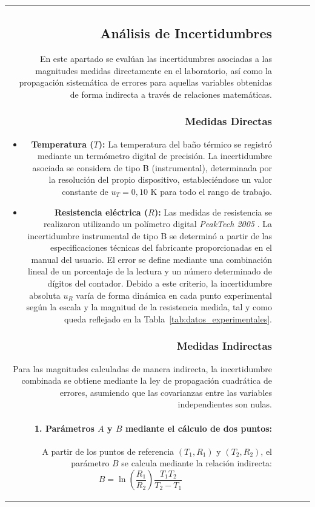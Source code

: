 \documentclass[11pt,a4paper]{article}
\begin{document}
\begin{itemize}
\begin{table}[ht!]
\begin{tabular}{r r r r r}
\subsection{Análisis de Incertidumbres}

En este apartado se evalúan las incertidumbres asociadas a las magnitudes medidas directamente en el laboratorio, así como la propagación sistemática de errores para aquellas variables obtenidas de forma indirecta a través de relaciones matemáticas.

\subsubsection{Medidas Directas}

\begin{itemize}
    \item \textbf{Temperatura ($T$):} La temperatura del baño térmico se registró mediante un termómetro digital de precisión. La incertidumbre asociada se considera de tipo B (instrumental), determinada por la resolución del propio dispositivo, estableciéndose un valor constante de $u_T = 0,10\text{ K}$ para todo el rango de trabajo.
    
    \item \textbf{Resistencia eléctrica ($R$):} Las medidas de resistencia se realizaron utilizando un polímetro digital \textit{PeakTech 2005} \cite{manual_peaktech}. La incertidumbre instrumental de tipo B se determinó a partir de las especificaciones técnicas del fabricante proporcionadas en el manual del usuario. El error se define mediante una combinación lineal de un porcentaje de la lectura y un número determinado de dígitos del contador. Debido a este criterio, la incertidumbre absoluta $u_R$ varía de forma dinámica en cada punto experimental según la escala y la magnitud de la resistencia medida, tal y como queda reflejado en la Tabla~\ref{tab:datos_experimentales}.
\end{itemize}

\subsubsection{Medidas Indirectas}

Para las magnitudes calculadas de manera indirecta, la incertidumbre combinada se obtiene mediante la ley de propagación cuadrática de errores, asumiendo que las covarianzas entre las variables independientes son nulas.

\paragraph{1. Parámetros $A$ y $B$ mediante el cálculo de dos puntos:}
A partir de los puntos de referencia $(T_1, R_1)$ y $(T_2, R_2)$, el parámetro $B$ se calcula mediante la relación indirecta:
\begin{equation}
B = \ln\left(\frac{R_1}{R_2}\right) \frac{T_1 T_2}{T_2 - T_1}
\end{equation}


\end{tabular}
\end{table}
\end{itemize}
\end{document}
